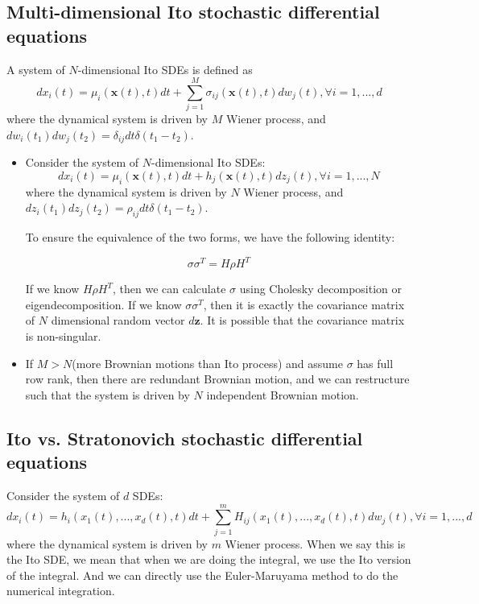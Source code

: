\begin{refsection}
\subsection{Multi-dimensional Ito stochastic differential equations}

\begin{definition}
	A system of $N$-dimensional Ito SDEs is defined as
	$$dx_i(t)=\mu_i(\bm{x}(t),t)dt+\sum_{j=1}^M\sigma_{ij}(\bm{x}(t),t)dw_j(t),\forall i=1,...,d$$
	where the dynamical system is driven by $M$ Wiener process, and $dw_i(t_1)dw_j(t_2) = \delta_{ij} dt \delta(t_1-t_2)$.
\end{definition}


\begin{note}\label{ch:theory-of-stochastic-process:remark:multiDimensionalItoSDEequivalenceandredundancyRerepresentation}\hfill
	\begin{itemize}
		\item Consider the system of $N$-dimensional Ito SDEs:
		$$dx_i(t)=\mu_i(\bm{x}(t),t)dt+ h_j(\bm{x}(t),t)dz_j(t),\forall i=1,...,N$$
		where the dynamical system is driven by $N$ Wiener process, and $dz_i(t_1)dz_j(t_2) = \rho_{ij}dt \delta(t_1-t_2)$.
		
		To ensure the equivalence of the two forms, we have the following identity:
		
		$$\sigma\sigma^T = H\rho H^T$$
		
		If we know $H\rho H^T$, then we can calculate $\sigma$ using Cholesky decomposition or eigendecomposition. If we know $\sigma\sigma^T$, then it is exactly the covariance matrix of $N$ dimensional random vector $d\bm{z}$. It is possible that the covariance matrix is non-singular.
		\item If $M > N$(more Brownian motions than Ito process) and assume $\sigma$ has full row rank, then there are redundant Brownian motion, and we can restructure such that the system is driven by $N$ independent Brownian motion. 
	\end{itemize}
\end{note}









\subsection{Ito vs. Stratonovich stochastic differential equations}
Consider the system of $d$ SDEs:
$$dx_i(t)=h_i(x_1(t),...,x_d(t),t)dt+\sum_{j=1}^mH_{ij}(x_1(t),...,x_d(t),t)dw_j(t),\forall i=1,...,d$$
where the dynamical system is driven by $m$ Wiener process. When we say this is the Ito SDE, we mean that when we are doing the integral, we use the Ito version of the integral. And we can directly use the Euler-Maruyama method to do the numerical integration. \\


\end{refsection}
